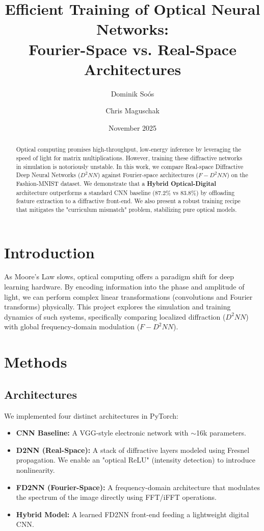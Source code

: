 \documentclass[11pt, a4paper]{article}
\title{\textbf{Efficient Training of Optical Neural Networks: \\ Fourier-Space vs. Real-Space Architectures}}
\author{Dominik Soós \and Chris Maguschak}
\date{November 2025}
\begin{document}
\maketitle

\begin{abstract}
Optical computing promises high-throughput, low-energy inference by leveraging the speed of light for matrix multiplications. However, training these diffractive networks in simulation is notoriously unstable. In this work, we compare Real-space Diffractive Deep Neural Networks ($D^2NN$) against Fourier-space architectures ($F-D^2NN$) on the Fashion-MNIST dataset. We demonstrate that a \textbf{Hybrid Optical-Digital} architecture outperforms a standard CNN baseline (87.2\% vs 83.8\%) by offloading feature extraction to a diffractive front-end. We also present a robust training recipe that mitigates the "curriculum mismatch" problem, stabilizing pure optical models.
\end{abstract}

\section{Introduction}
As Moore's Law slows, optical computing offers a paradigm shift for deep learning hardware. By encoding information into the phase and amplitude of light, we can perform complex linear transformations (convolutions and Fourier transforms) physically. This project explores the simulation and training dynamics of such systems, specifically comparing localized diffraction ($D^2NN$) with global frequency-domain modulation ($F-D^2NN$).

\section{Methods}

\subsection{Architectures}
We implemented four distinct architectures in PyTorch:
\begin{itemize}
    \item \textbf{CNN Baseline:} A VGG-style electronic network with $\sim$16k parameters.
    \item \textbf{D2NN (Real-Space):} A stack of diffractive layers modeled using Fresnel propagation. We enable an "optical ReLU" (intensity detection) to introduce nonlinearity.
    \item \textbf{FD2NN (Fourier-Space):} A frequency-domain architecture that modulates the spectrum of the image directly using FFT/iFFT operations.
    \item \textbf{Hybrid Model:} A learned FD2NN front-end feeding a lightweight digital CNN.
\end{itemize}
\end{document}
